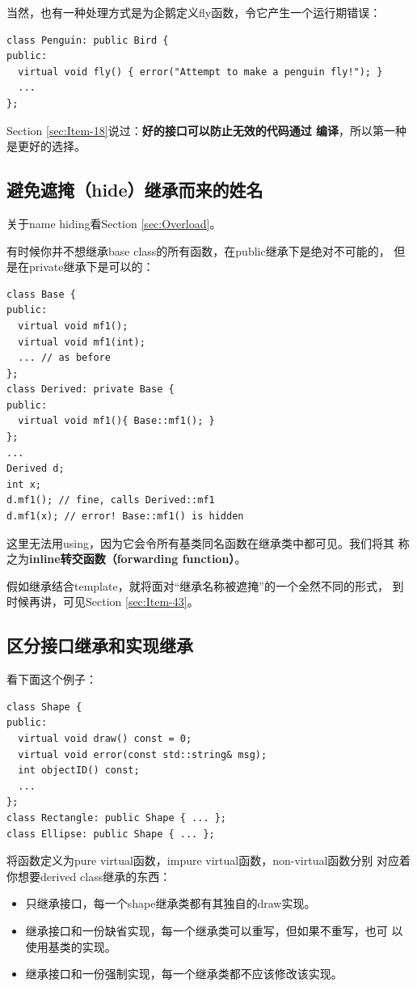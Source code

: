 当然，也有一种处理方式是为企鹅定义fly函数，令它产生一个运行期错误：
\begin{verbatim}
class Penguin: public Bird {
public:
  virtual void fly() { error("Attempt to make a penguin fly!"); }
  ...
};
\end{verbatim}

Section \ref{sec:Item-18}说过：\textbf{好的接口可以防止无效的代码通过
  编译}，所以第一种是更好的选择。

\subsection{避免遮掩（hide）继承而来的姓名}
\label{sec:Item-33}

关于name hiding看Section \ref{sec:Overload}。

有时候你并不想继承base class的所有函数，在public继承下是绝对不可能的，
但是在private继承下是可以的：
\begin{verbatim}
class Base {
public:
  virtual void mf1();
  virtual void mf1(int);
  ... // as before
};
class Derived: private Base {
public:
  virtual void mf1(){ Base::mf1(); } 
};
...
Derived d;
int x;
d.mf1(); // fine, calls Derived::mf1
d.mf1(x); // error! Base::mf1() is hidden
\end{verbatim}
这里无法用using，因为它会令所有基类同名函数在继承类中都可见。我们将其
称之为\textbf{inline转交函数（forwarding function）}。

假如继承结合template，就将面对“继承名称被遮掩”的一个全然不同的形式，
到时候再讲，可见Section \ref{sec:Item-43}。

\subsection{区分接口继承和实现继承}
\label{sec:Item-34}

看下面这个例子：
\begin{verbatim}
class Shape {
public:
  virtual void draw() const = 0;
  virtual void error(const std::string& msg);
  int objectID() const;
  ...
};
class Rectangle: public Shape { ... };
class Ellipse: public Shape { ... };
\end{verbatim}

将函数定义为pure virtual函数，impure virtual函数，non-virtual函数分别
对应着你想要derived class继承的东西：
\begin{itemize}
\item 只继承接口，每一个shape继承类都有其独自的draw实现。
\item 继承接口和一份缺省实现，每一个继承类可以重写，但如果不重写，也可
  以使用基类的实现。
\item 继承接口和一份强制实现，每一个继承类都不应该修改该实现。
\end{itemize}

